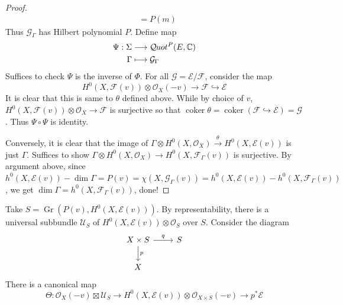 \documentclass{ctexart}
\newcommand{\coker}{\operatorname{coker}}
\newcommand{\grassmannianscheme}[2]{\operatorname{Gr}(#1, #2)}
\newcommand{\quotfunctor}{\mathcal{Q}\kern -.5pt uot}
\begin{document}
\begin{proof}
\begin{equation}
\begin{split}
            & = P(m)
        \end{split}
    \end{equation}
    Thus $\mathcal{G}_{\Gamma}$ has Hilbert polynomial $P$.
    Define map
    \begin{equation}
        \begin{split}
            \Psi: \Sigma & \longrightarrow \quotfunctor^{P}(E, \mathbb{C}) \\
            \Gamma & \longmapsto \mathcal{G}_{\Gamma}
        \end{split}
    \end{equation}
    Suffices to check $\Psi$ is the inverse of $\Phi$.
    For all $\mathcal{G} = \mathcal{E}/\mathcal{F}$, consider the map
    \begin{equation}
        H^{0}(X, \mathcal{F}(v)) \otimes \mathcal{O}_{X}(-v) \rightarrow \mathcal{F} \hookrightarrow \mathcal{E}
    \end{equation}
    It is clear that this is same to $\theta$ defined above.
    While by choice of $v$, $H^{0}(X, \mathcal{F}(v)) \otimes \mathcal{O}_{X} \rightarrow \mathcal{F}$ is surjective so that $\coker \theta = \coker (\mathcal{F} \hookrightarrow \mathcal{E}) = \mathcal{G}$.
    Thus $\Psi \circ \Psi$ is identity.
    \par
    Conversely, it is clear that the image of $\Gamma \otimes H^{0}(X, \mathcal{O}_{X}) \overset{\theta}{\rightarrow} H^{0}(X, \mathcal{E}(v))$ is just $\Gamma$.
    Suffices to show $\Gamma \otimes H^{0}(X, \mathcal{O}_{X}) \rightarrow H^{0}(X, \mathcal{F}_{\Gamma}(v))$ is surjective.
    By argument above, since $h^{0}(X, \mathcal{E}(v)) - \dim \Gamma = P(v) = \chi(X, \mathcal{G}_{\Gamma}(v)) = h^{0}(X, \mathcal{E}(v)) - h^{0}(X, \mathcal{F}_{\Gamma}(v))$,
    we get $\dim \Gamma = h^{0}(X, \mathcal{F}_{\Gamma}(v))$, done!
\end{proof}
Take $S = \grassmannianscheme{P(v)}{H^{0}(X, \mathcal{E}(v))}$.
By representability, there is a universal subbundle $\mathcal{U}_{S}$ of $H^{0}(X, \mathcal{E}(v)) \otimes \mathcal{O}_{S}$ over $S$.
Consider the diagram
\begin{equation}
    \begin{tikzcd}
        X \times S \arrow[r, "q"] \arrow[d, "p"] &
        S \\
        X &
    \end{tikzcd}
\end{equation}
There is a canonical map
\begin{equation}
    \Theta: \mathcal{O}_{X}(-v) \boxtimes \mathcal{U}_{S} \rightarrow H^{0}(X, \mathcal{E}(v)) \otimes \mathcal{O}_{X \times S}(-v) \rightarrow p^{\ast}\mathcal{E}
\end{equation}
\end{document}
